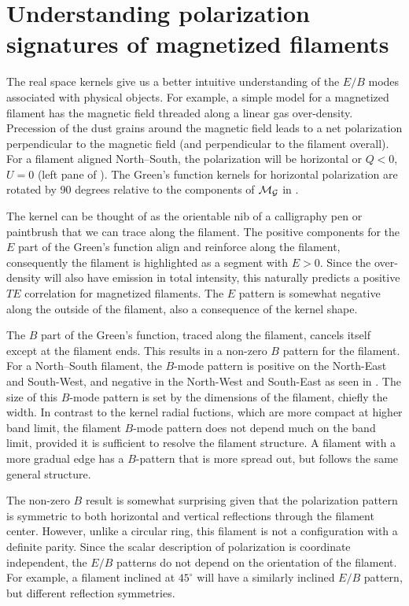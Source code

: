 \section{Understanding polarization signatures of magnetized filaments}
\label{sec:pol_filaments}

The real space kernels give us a better intuitive understanding of the $E/B$ modes associated with physical objects.  For example, a simple model for a magnetized filament has the magnetic field threaded along a linear gas over-density.  Precession of the dust grains around the magnetic field leads to a net polarization perpendicular to the magnetic field (and perpendicular to the filament overall).  For a filament aligned North--South, the polarization will be horizontal or $Q<0$, $U=0$ (left pane of ).  The Green's function kernels for horizontal polarization are rotated by 90 degrees relative to the components of $\cal{M}_G$ in .

The kernel can be thought of as the orientable nib of a calligraphy pen or paintbrush that we can trace along the filament.  The positive components for the $E$ part of the Green's function align and reinforce along the filament, consequently the filament is highlighted as a segment with $E>0$.  Since the over-density will also have emission in total intensity, this naturally predicts a positive $TE$ correlation for magnetized filaments.  The $E$ pattern is somewhat negative along the outside of the filament, also a consequence of the kernel shape.

The $B$ part of the Green's function, traced along the filament, cancels itself except at the filament ends.  This results in a non-zero $B$ pattern for the filament.  For a North--South filament, the $B$-mode pattern is positive on the North-East and South-West, and negative in the North-West and South-East as seen in .  The size of this $B$-mode pattern is set by the dimensions of the filament, chiefly the width.  In contrast to the kernel radial fuctions, which are more compact at higher band limit, the filament $B$-mode  pattern does not depend much on the band limit, provided it is sufficient to resolve the filament structure.  A filament with a more gradual edge has a $B$-pattern that is more spread out, but follows the same general structure.

The non-zero $B$ result is somewhat surprising given that the polarization pattern is symmetric to both horizontal and vertical reflections through the filament center.  However, unlike a circular ring, this filament is not a configuration with a definite parity.  Since the scalar description of polarization is coordinate independent, the $E/B$ patterns do not depend on the orientation of the filament.  For example, a filament inclined at $45^\circ$ will have a similarly inclined $E/B$ pattern, but different reflection symmetries.  

